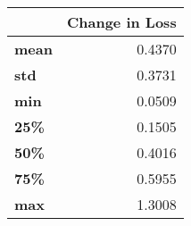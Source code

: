 \begin{tabular}{lr}
\toprule
{} &  Change in Loss \\
\midrule
\textbf{mean} &          0.4370 \\
\textbf{std } &          0.3731 \\
\textbf{min } &          0.0509 \\
\textbf{25\% } &          0.1505 \\
\textbf{50\% } &          0.4016 \\
\textbf{75\% } &          0.5955 \\
\textbf{max } &          1.3008 \\
\bottomrule
\end{tabular}
